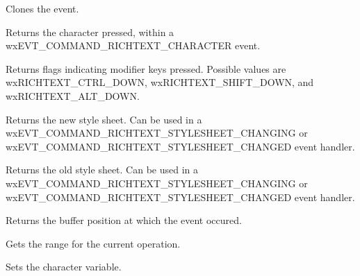 \label{wxrichtexteventclone}


Clones the event.

\label{wxrichtexteventgetcharacter}


Returns the character pressed, within a wxEVT\_COMMAND\_RICHTEXT\_CHARACTER event.

\label{wxrichtexteventgetflags}


Returns flags indicating modifier keys pressed. Possible values are wxRICHTEXT\_CTRL\_DOWN,
wxRICHTEXT\_SHIFT\_DOWN, and wxRICHTEXT\_ALT\_DOWN.

\label{wxrichtexteventgetnewstylesheet}


Returns the new style sheet. Can be used in a wxEVT\_COMMAND\_RICHTEXT\_STYLESHEET\_CHANGING or
wxEVT\_COMMAND\_RICHTEXT\_STYLESHEET\_CHANGED event handler.

\label{wxrichtexteventgetoldstylesheet}


Returns the old style sheet. Can be used in a wxEVT\_COMMAND\_RICHTEXT\_STYLESHEET\_CHANGING or
wxEVT\_COMMAND\_RICHTEXT\_STYLESHEET\_CHANGED event handler.

\label{wxrichtexteventgetposition}


Returns the buffer position at which the event occured.

\label{wxrichtexteventgetrange}


Gets the range for the current operation.

\label{wxrichtexteventsetcharacter}


Sets the character variable.


